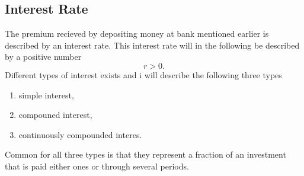 \documentclass{article}
\theoremstyle{definition}
\numberwithin{equation}{section}
\begin{document}
\subsection{Interest Rate}
The premium recieved by depositing money at bank mentioned earlier is described by an interest rate.
This interest rate will in the following be described by a positive number $$r>0.$$
Different types of interest exists and i will describe the following three types
\begin{enumerate}
    \item simple interest,
    \item compouned interest,
    \item continuously compounded interes.
\end{enumerate}
Common for all three types is that they represent a fraction of an investment that is paid either ones or through several periods.
\end{document}
